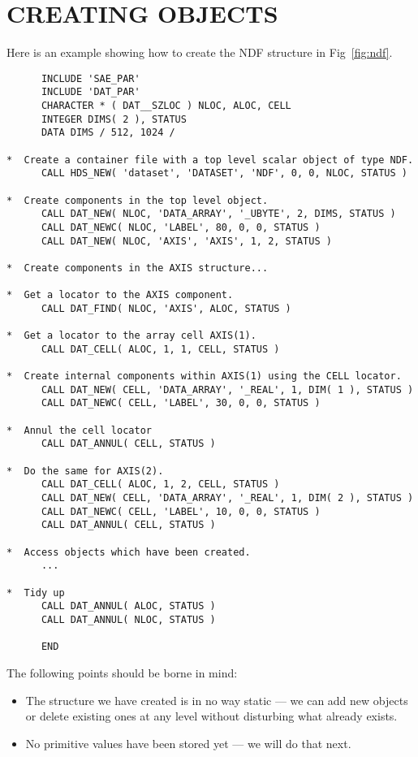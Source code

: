 \section{CREATING OBJECTS}
\label{sect:creating}

Here is an example showing how to create the NDF structure in
Fig~\ref{fig:ndf}. 

\small
\begin{verbatim}
      INCLUDE 'SAE_PAR'
      INCLUDE 'DAT_PAR'
      CHARACTER * ( DAT__SZLOC ) NLOC, ALOC, CELL
      INTEGER DIMS( 2 ), STATUS
      DATA DIMS / 512, 1024 /

*  Create a container file with a top level scalar object of type NDF.
      CALL HDS_NEW( 'dataset', 'DATASET', 'NDF', 0, 0, NLOC, STATUS )

*  Create components in the top level object.
      CALL DAT_NEW( NLOC, 'DATA_ARRAY', '_UBYTE', 2, DIMS, STATUS )
      CALL DAT_NEWC( NLOC, 'LABEL', 80, 0, 0, STATUS )
      CALL DAT_NEW( NLOC, 'AXIS', 'AXIS', 1, 2, STATUS )

*  Create components in the AXIS structure...

*  Get a locator to the AXIS component.
      CALL DAT_FIND( NLOC, 'AXIS', ALOC, STATUS )

*  Get a locator to the array cell AXIS(1).
      CALL DAT_CELL( ALOC, 1, 1, CELL, STATUS )

*  Create internal components within AXIS(1) using the CELL locator.
      CALL DAT_NEW( CELL, 'DATA_ARRAY', '_REAL', 1, DIM( 1 ), STATUS )
      CALL DAT_NEWC( CELL, 'LABEL', 30, 0, 0, STATUS )

*  Annul the cell locator
      CALL DAT_ANNUL( CELL, STATUS )

*  Do the same for AXIS(2).
      CALL DAT_CELL( ALOC, 1, 2, CELL, STATUS )
      CALL DAT_NEW( CELL, 'DATA_ARRAY', '_REAL', 1, DIM( 2 ), STATUS )
      CALL DAT_NEWC( CELL, 'LABEL', 10, 0, 0, STATUS )
      CALL DAT_ANNUL( CELL, STATUS )

*  Access objects which have been created.
      ...

*  Tidy up
      CALL DAT_ANNUL( ALOC, STATUS )
      CALL DAT_ANNUL( NLOC, STATUS )

      END
\end{verbatim}
\normalsize

The following points should be borne in mind:
\begin{itemize}

\item The structure we have created is in no way static --- we can add new
objects or delete existing ones at any level without disturbing what already
exists. 

\item No primitive values have been stored yet --- we will do that next. 

\end{itemize}

